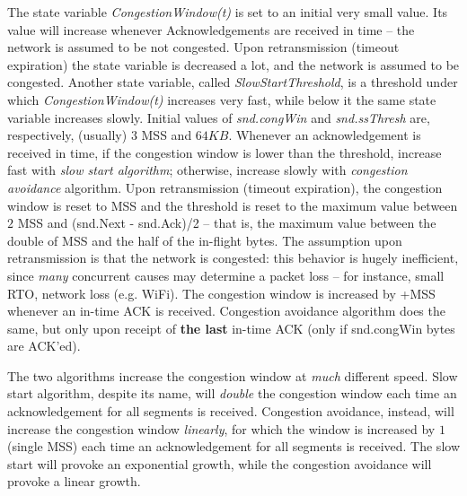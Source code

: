 \documentclass[10pt]{book}
\begin{document}
The state variable \emph{CongestionWindow(t)} is set to an initial very small
value. Its value will increase whenever Acknowledgements are received in time
\--- the network is assumed to be not congested. Upon retransmission (timeout
expiration) the state variable is decreased a lot, and the network is assumed
to be congested. Another state variable, called \emph{SlowStartThreshold}, is
a threshold under which \emph{CongestionWindow(t)} increases very fast, while
below it the same state variable increases slowly. Initial values of
\emph{snd.congWin} and \emph{snd.ssThresh} are, respectively, (usually) $3$ MSS
and $64KB$. Whenever an acknowledgement is received in time, if the congestion
window is lower than the threshold, increase fast with \emph{slow start
algorithm}; otherwise, increase slowly with \emph{congestion avoidance}
algorithm. Upon retransmission (timeout expiration), the congestion window is
reset to MSS and the threshold is reset to the maximum value between $2$ MSS
and (snd.Next - snd.Ack)/2 \--- that is, the maximum value between the double
of MSS and the half of the in-flight bytes. The assumption upon retransmission
is that the network is congested: this behavior is hugely inefficient, since
\emph{many} concurrent causes may determine a packet loss \--- for instance,
small RTO, network loss (e.g. WiFi). The congestion window is increased by +MSS
whenever an in-time ACK is received. Congestion avoidance algorithm does the
same, but only upon receipt of \textbf{the last} in-time ACK (only if
snd.congWin bytes are ACK'ed). 

The two algorithms increase the congestion window at \emph{much} different
speed. Slow start algorithm, despite its name, will \emph{double} the
congestion window each time an acknowledgement for all segments is received.
Congestion avoidance, instead, will increase the congestion window
\emph{linearly}, for which the window is increased by $1$ (single MSS) each
time an acknowledgement for all segments is received. The slow start will
provoke an exponential growth, while the congestion avoidance will provoke a
linear growth. 
\end{document}

